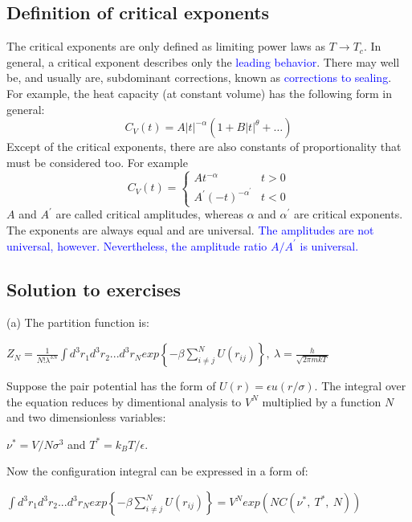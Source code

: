 \documentclass[12pt,titlepage]{article}
\newcommand{\bluep}[1]{\textcolor{blue}{#1}}
\numberwithin{equation}{section}
\begin{document}
\subsection{Definition of critical exponents}
The critical exponents are only defined as limiting power laws as $T \rightarrow T_{c} .$ In general, a critical exponent describes only the \bluep{leading behavior}. There may well be, and usually are, subdominant corrections, known as \bluep{corrections to sealing}. For example, the heat capacity (at constant volume) has the following form in general:
\begin{equation}
C_{V}(t)=A|t|^{-\alpha}\left(1+B|t|^{\theta}+\dots\right)
\end{equation}
Except of the critical exponents, there are also constants of proportionality that must be considered too. For example
\begin{equation}
C_{V}(t)=\left\{\begin{array}{ll}{A t^{-\alpha}} & {t>0} \\ {A^{\prime}(-t)^{-\alpha^{\prime}}} & {t<0}\end{array}\right.
\end{equation}
$A$ and $A^{\prime}$ are called critical amplitudes, whereas $\alpha$ and $\alpha^{\prime}$ are critical exponents. The exponents are always equal and are universal. \bluep{The amplitudes are not universal, however. Nevertheless, the amplitude ratio $A / A^{\prime}$ is universal.}

\subsection{Solution to exercises}
\noindent(a) The partition function is:

$\displaystyle Z_{N} =\frac{1}{N!\lambda ^{3N}}\int d^{3} r_{1} d^{3} r_{2} ...d^{3} r_{N} exp\left\{-\beta \sum ^{N}_{i\neq j} U( r_{ij})\right\} ,\ \lambda =\frac{h}{\sqrt{2\pi mkT}}$

Suppose the pair potential has the form of $\displaystyle U( r) =\epsilon u( r/\sigma )$. The integral over the equation reduces by dimentional analysis to $\displaystyle V^{N}$ multiplied by a function $\displaystyle N$ and two dimensionless variables:

$\displaystyle \nu ^{*} =V/N\sigma ^{3}$ and $\displaystyle T^{*} =k_{B} T/\epsilon $. 

Now the configuration integral can be expressed in a form of:

$ $$\displaystyle \int d^{3} r_{1} d^{3} r_{2} ...d^{3} r_{N} exp\left\{-\beta \sum ^{N}_{i\neq j} U( r_{ij})\right\} =V^{N} exp\left( NC\left( \nu ^{*} ,\ T^{*} ,\ N\right)\right)$
\end{document}
